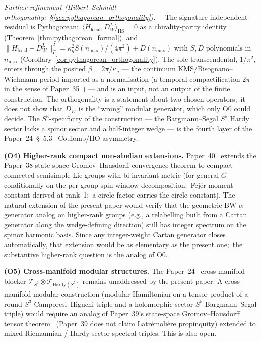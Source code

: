 \documentclass[11pt,a4paper]{article}
\theoremstyle{plain}
\theoremstyle{definition}
\newcommand{\sthree}{S^{3}}
\newcommand{\Tcal}{\mathcal{T}}
\begin{document}
\emph{Further refinement (Hilbert--Schmidt orthogonality;\
\S\ref{sec:pythagorean_orthogonality}).}\ \ %
The signature-independent residual is Pythagorean:\
$\langle H_{\mathrm{local}}, D_W^L \rangle_{\mathrm{HS}} = 0$ as a
chirality-parity identity (Theorem~\ref{thm:pythagorean_formal}), and
$\|H_{\mathrm{local}} - D_W^L\|_F^2 = \kappa_g^2 S(n_{\max})/(4\pi^2) +
D(n_{\max})$ with $S, D$ polynomials in $n_{\max}$
(Corollary~\ref{cor:pythagorean_orthogonality}).  The sole transcendental,
$1/\pi^2$, enters through the posited $\beta = 2\pi/\kappa_g$ --- the
continuum KMS/Bisognano--Wichmann period imported as a normalisation (a
temporal-compactification $2\pi$ in the sense of Paper~35~\cite{paper35})
--- and is an input, not an output of the finite construction.  The
orthogonality is a statement about two chosen operators;\ it does not show
that $D_W$ is the ``wrong'' modular generator, which only O0 could decide.
The $S^3$-specificity of the construction --- the Bargmann--Segal $S^5$
Hardy sector lacks a spinor sector and a half-integer wedge --- is the
fourth layer of the Paper~24~\S~5.3~\cite{paper24} Coulomb/HO asymmetry.

\textbf{(O4) Higher-rank compact non-abelian extensions.}
Paper~40~\cite{paper40_unified} extends the Paper~38 state-space
Gromov--Hausdorff convergence theorem to compact connected semisimple Lie
groups with bi-invariant metric (for general $G$ conditionally on the per-group spin-window decomposition;\ Fej\'er-moment constant derived at rank~1;\ a circle factor carries the circle constant). The natural extension of the present paper would
verify that the geometric BW-$\alpha$ generator analog on higher-rank
groups (e.g., a relabelling built from a Cartan generator along the
wedge-defining direction) still has integer spectrum on the
spinor harmonic basis.  Since any integer-weight Cartan generator
closes automatically, that extension would be as elementary as the
present one;\ the substantive higher-rank question is the analog of O0.

\textbf{(O5) Cross-manifold modular structures.}
The Paper~24~\cite{paper24} cross-manifold blocker
$\Tcal_{\sthree} \otimes \Tcal_{\mathrm{Hardy}(S^5)}$ remains
unaddressed by the present paper. A cross-manifold modular construction
(modular Hamiltonian on a tensor product of a round $\sthree$
Camporesi--Higuchi triple and a holomorphic-sector $S^5$
Bargmann--Segal triple) would require an analog of Paper~39's
state-space Gromov--Hausdorff tensor theorem~\cite{paper39} (Paper~39 does
not claim Latr\'emoli\`ere propinquity) extended to mixed Riemannian /
Hardy-sector spectral triples. This is also open.
\end{document}
